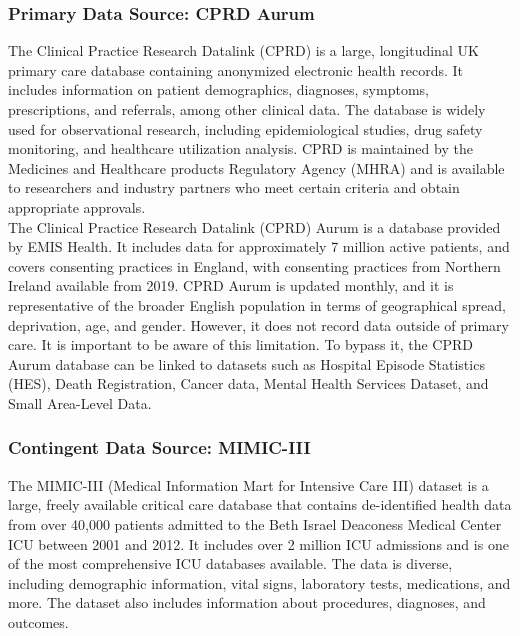 \documentclass[%
 reprint,
 amsmath,amssymb,
 aps,
 nofootinbib
]{revtex4-2}
\theoremstyle{definition}
\begin{document}
\subsubsection{\label{cprd} Primary Data Source: CPRD Aurum}
The Clinical Practice Research Datalink (CPRD) is a large, longitudinal UK primary care database containing anonymized electronic health records. It includes information on patient demographics, diagnoses, symptoms, prescriptions, and referrals, among other clinical data. The database is widely used for observational research, including epidemiological studies, drug safety monitoring, and healthcare utilization analysis. CPRD is maintained by the Medicines and Healthcare products Regulatory Agency (MHRA) and is available to researchers and industry partners who meet certain criteria and obtain appropriate approvals.\\

The Clinical Practice Research Datalink (CPRD) Aurum is a database provided by EMIS Health. It includes data for approximately 7 million active patients, and covers consenting practices in England, with consenting practices from Northern Ireland available from 2019. CPRD Aurum is updated monthly, and it is representative of the broader English population in terms of geographical spread, deprivation, age, and gender. However, it does not record data outside of primary care. It is important to be aware of this limitation. To bypass it, the CPRD Aurum database can be linked to datasets such as Hospital Episode Statistics (HES), Death Registration, Cancer data, Mental Health Services Dataset, and Small Area-Level Data.

\subsubsection{\label{mimiciii} Contingent Data Source: MIMIC-III}

The MIMIC-III (Medical Information Mart for Intensive Care III) dataset is a large, freely available critical care database that contains de-identified health data from over 40,000 patients admitted to the Beth Israel Deaconess Medical Center ICU between 2001 and 2012. It includes over 2 million ICU admissions and is one of the most comprehensive ICU databases available. The data is diverse, including demographic information, vital signs, laboratory tests, medications, and more. The dataset also includes information about procedures, diagnoses, and outcomes.\\
\end{document}
